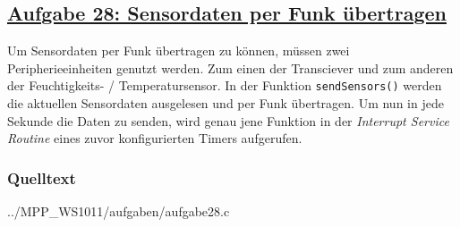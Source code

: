 \subsection
{\href{http://cst.mi.fu-berlin.de/intern/19606-P-MPP/Aufgaben/041102.html}
{Aufgabe 28: Sensordaten per Funk übertragen}}

Um Sensordaten per Funk übertragen zu können, müssen zwei Peripherieeinheiten  genutzt werden.
Zum einen der Transciever und zum anderen der Feuchtigkeits- / Temperatursensor.
In der Funktion \texttt{sendSensors()} werden die aktuellen Sensordaten ausgelesen und per Funk übertragen.
Um nun in jede Sekunde die Daten zu senden, wird genau jene Funktion in der \textit{Interrupt Service Routine} eines zuvor konfigurierten Timers aufgerufen.

\subsubsection*{Quelltext}


{../MPP_WS1011/aufgaben/aufgabe28.c}


%

%

